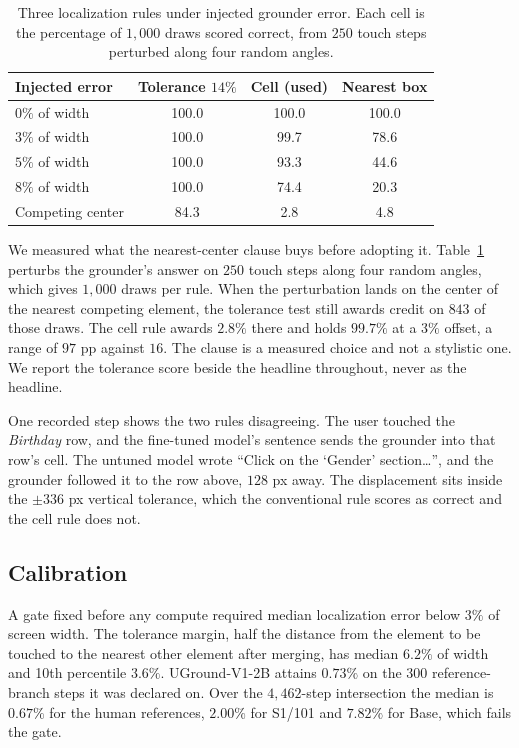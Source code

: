 \documentclass[conference]{IEEEtran}
\begin{document}
\begin{table}[t]
\caption{Three localization rules under injected grounder error. Each cell is the percentage of
$1{,}000$ draws scored correct, from $250$ touch steps perturbed along four random angles.}
\label{tab:inject}
\centering
\footnotesize
\setlength{\tabcolsep}{4pt}
\begin{tabular}{@{}lccc@{}}
\toprule
Injected error & Tolerance $14\%$ & Cell (used) & Nearest box \\
\midrule
$0\%$ of width & 100.0 & 100.0 & 100.0 \\
$3\%$ of width & 100.0 & 99.7 & 78.6 \\
$5\%$ of width & 100.0 & 93.3 & 44.6 \\
$8\%$ of width & 100.0 & 74.4 & 20.3 \\
Competing center & 84.3 & 2.8 & 4.8 \\
\bottomrule
\end{tabular}
\end{table}

We measured what the nearest-center clause buys before adopting it. Table~\ref{tab:inject}
perturbs the grounder's answer on $250$ touch steps along four random angles, which gives
$1{,}000$ draws per rule. When the perturbation lands on the center of the nearest competing
element, the tolerance test still awards credit on $843$ of those draws. The cell rule
awards $2.8\%$ there and holds $99.7\%$ at a $3\%$ offset, a range of $97$ pp against $16$.
The clause is a measured choice and not a stylistic one. We report the tolerance score beside the
headline throughout, never as the headline.

One recorded step shows the two rules disagreeing. The user touched the \emph{Birthday} row,
and the fine-tuned model's sentence sends the grounder into that row's cell. The untuned model
wrote ``Click on the `Gender' section\ldots'', and the grounder followed it to the row above,
$128$ px away. The displacement sits inside the $\pm336$ px vertical tolerance, which the
conventional rule scores as correct and the cell rule does not.

\subsection{Calibration}
A gate fixed before any compute required median localization error below $3\%$ of
screen width. The tolerance margin, half the distance from the element to be touched to the
nearest other element after merging, has median $6.2\%$ of width and 10th percentile $3.6\%$.
UGround-V1-2B attains $0.73\%$ on the $300$ reference-branch steps it was declared
on. Over the $4{,}462$-step intersection the median is $0.67\%$ for the human references, $2.00\%$
for S1/101 and $7.82\%$ for Base, which fails the gate.
\end{document}
